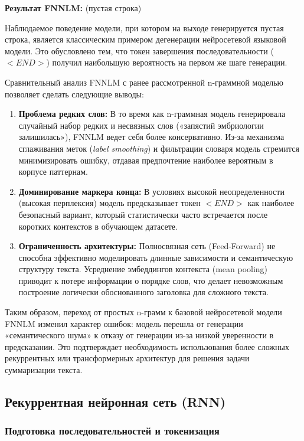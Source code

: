 \documentclass[coursework]{SCWorks}
\begin{document}
    \textbf{Результат FNNLM:} (пустая строка)

    Наблюдаемое поведение модели, при котором на выходе генерируется пустая строка, является классическим примером дегенерации нейросетевой языковой модели. Это обусловлено тем, что токен завершения последовательности ($<END>$) получил наибольшую вероятность на первом же шаге генерации.

    Сравнительный анализ FNNLM с ранее рассмотренной n-граммной моделью позволяет сделать следующие выводы:
    \begin{enumerate}
        \item \textbf{Проблема редких слов:} В то время как n-граммная модель генерировала случайный набор редких и несвязных слов («запястий эмбриологии залишилась»), FNNLM ведет себя более консервативно. Из-за механизма сглаживания меток (\textit{label smoothing}) и фильтрации словаря модель стремится минимизировать ошибку, отдавая предпочтение наиболее вероятным в корпусе паттернам.
        \item \textbf{Доминирование маркера конца:} В условиях высокой неопределенности (высокая перплексия) модель предсказывает токен $<END>$ как наиболее безопасный вариант, который статистически часто встречается после коротких контекстов в обучающем датасете.
        \item \textbf{Ограниченность архитектуры:} Полносвязная сеть (Feed-Forward) не способна эффективно моделировать длинные зависимости и семантическую структуру текста. Усреднение эмбеддингов контекста (mean pooling) приводит к потере информации о порядке слов, что делает невозможным построение логически обоснованного заголовка для сложного текста.
    \end{enumerate}

    Таким образом, переход от простых n-грамм к базовой нейросетевой модели FNNLM изменил характер ошибок: модель перешла от генерации «семантического шума» к отказу от генерации из-за низкой уверенности в предсказании. Это подтверждает необходимость использования более сложных рекуррентных или трансформерных архитектур для решения задачи суммаризации текста.

    \subsection{Рекуррентная нейронная сеть (RNN)}

    \subsubsection{Подготовка последовательностей и токенизация}
\end{document}
